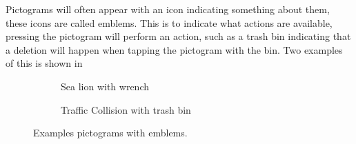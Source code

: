 Pictograms will often appear with an icon indicating something about them, these icons are called emblems.
This is to indicate what actions are available, pressing the pictogram will perform an action, such as a trash bin indicating that a deletion will happen when tapping the pictogram with the bin.
Two examples of this is shown in~

\begin{figure}[H]
    \centering
    \begin{subfigure}[b]{0.2\textwidth}
        \caption{Sea lion with wrench}
        \label{fig:sealion-with-wrench}
    \end{subfigure}
    \qquad
    \begin{subfigure}[b]{0.2\textwidth}
        \caption{Traffic Collision with trash bin}
        \label{fig:trafficcollision-with-wrench}
    \end{subfigure}
    \caption{Examples pictograms with emblems.}\label{fig:pictograms_with_indicators}
\end{figure}
